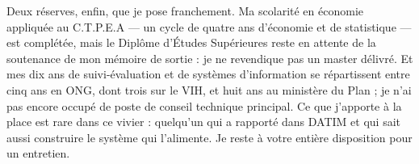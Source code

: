 \documentclass[11pt,a4paper,sans]{moderncv}
\begin{document}
Deux réserves, enfin, que je pose franchement. Ma scolarité en économie appliquée au C.T.P.E.A --- un cycle de quatre ans d'économie et de statistique --- est complétée, mais le Diplôme d'Études Supérieures reste en attente de la soutenance de mon mémoire de sortie : je ne revendique pas un master délivré. Et mes dix ans de suivi-évaluation et de systèmes d'information se répartissent entre cinq ans en ONG, dont trois sur le VIH, et huit ans au ministère du Plan ; je n'ai pas encore occupé de poste de conseil technique principal. Ce que j'apporte à la place est rare dans ce vivier : quelqu'un qui a rapporté dans DATIM et qui sait aussi construire le système qui l'alimente. Je reste à votre entière disposition pour un entretien.

\makeletterclosing
\end{document}
